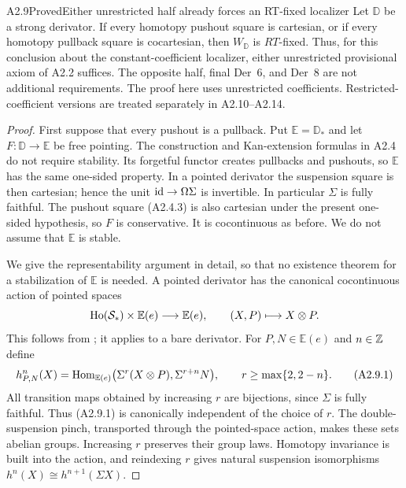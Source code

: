 \begin{claim}{A2.9}{Proved}{Either unrestricted half already forces an RT-fixed localizer}
\label{A2-half-RT}
Let $\mathbb D$ be a strong derivator. If every homotopy pushout square is
cartesian, or if every homotopy pullback square is cocartesian, then
$W_{\mathbb D}$ is $RT$-fixed. Thus, for this conclusion about the
constant-coefficient localizer, either unrestricted provisional axiom of
A2.2 suffices. The opposite half, final Der~6, and Der~8 are not additional
requirements. The proof here uses unrestricted coefficients. Restricted-coefficient
versions are treated separately in A2.10--A2.14.
\end{claim}
\begin{proof}
First suppose that every pushout is a pullback. Put
$\mathbb E=\mathbb D_*$ and let $F:\mathbb D\to\mathbb E$ be free pointing.
The construction and Kan-extension formulas in A2.4 do not require
stability. Its forgetful functor creates pullbacks and pushouts, so
$\mathbb E$ has the same one-sided property. In a pointed derivator the
suspension square is then cartesian; hence the unit
$\operatorname{id}\to\Omega\Sigma$ is invertible. In particular $\Sigma$ is fully faithful.
The pushout square (A2.4.3) is also cartesian under the present one-sided
hypothesis, so $F$ is conservative. It is cocontinuous as before.
We do not assume that $\mathbb E$ is stable.

We give the representability argument in detail, so that no existence
theorem for a stabilization of $\mathbb E$ is needed. A pointed derivator
has the canonical cocontinuous action of pointed spaces
\[
 \mathrm{Ho}(\mathcal S_*)\times\mathbb E(e)\longrightarrow\mathbb E(e),
 \qquad (X,P)\longmapsto X\otimes P.
\]
This follows from \cite[Corollary~4.19 and Theorem~5.22]{A2CisinskiKan};
it applies to a bare derivator. For $P,N\in\mathbb E(e)$ and $n\in\mathbb Z$
define
\[
 h^n_{P,N}(X)=
 \operatorname{Hom}_{\mathbb E(e)}
   \bigl(\Sigma^r(X\otimes P),\Sigma^{r+n}N\bigr),
 \qquad r\geq\max\{2,2-n\}.
 \tag{A2.9.1}
\]
All transition maps obtained by increasing $r$ are bijections, since
$\Sigma$ is fully faithful. Thus (A2.9.1) is canonically independent of the
choice of $r$. The double-suspension pinch, transported through the
pointed-space action, makes these sets abelian groups. Increasing $r$
preserves their group laws. Homotopy invariance is built into the action,
and reindexing $r$ gives natural suspension isomorphisms
$h^n(X)\cong h^{n+1}(\Sigma X)$.


\end{proof}
